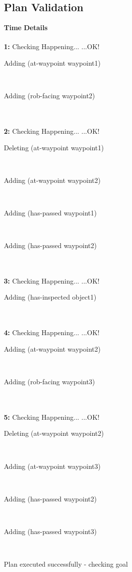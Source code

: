\documentclass[a4paper,12pt]{article}
\newcommand{\headingtimedetails}{{\bf Time} \qquad \= {\bf Details}\\[0.8ex]}
\newcommand{\atime}[1]{{\bf #1:}}
\newcommand{\exprn}[1]{{\sf #1}}
\newcommand{\checkhappening}{Checking Happening... }
\newcommand{\listrow}[1]{\begin{minipage}[t]{11.5cm} #1 \end{minipage}}
\newcommand{\happeningOK}{...OK!}
\newcommand{\adding}[1]{\listrow{Adding \exprn{#1} }}
\newcommand{\deleting}[1]{\listrow{Deleting \exprn{#1} }}
\begin{document}
\subsection{Plan Validation}
\begin{tabbing}
\headingtimedetails 
\\
\atime{1} \> \checkhappening\happeningOK\\
 \> \adding{(at-waypoint waypoint1)}\\
 \> \adding{(rob-facing waypoint2)}\\
\\
\atime{2} \> \checkhappening\happeningOK\\
 \> \deleting{(at-waypoint waypoint1)}\\
 \> \adding{(at-waypoint waypoint2)}\\
 \> \adding{(has-passed waypoint1)}\\
 \> \adding{(has-passed waypoint2)}\\
\\
\atime{3} \> \checkhappening\happeningOK\\
 \> \adding{(has-inspected object1)}\\
\\
\atime{4} \> \checkhappening\happeningOK\\
 \> \adding{(at-waypoint waypoint2)}\\
 \> \adding{(rob-facing waypoint3)}\\
\\
\atime{5} \> \checkhappening\happeningOK\\
 \> \deleting{(at-waypoint waypoint2)}\\
 \> \adding{(at-waypoint waypoint3)}\\
 \> \adding{(has-passed waypoint2)}\\
 \> \adding{(has-passed waypoint3)}\\
\end{tabbing}
Plan executed successfully - checking goal\\
\\
\end{document}
